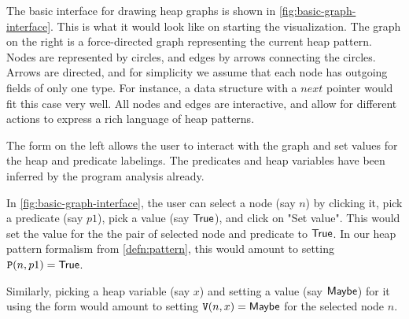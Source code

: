 The basic interface for drawing heap graphs is shown in \autoref{fig:basic-graph-interface}. This is what it would look like on starting the visualization. The graph on the right is a force-directed graph representing the current heap pattern. Nodes are represented by circles, and edges by arrows connecting the circles. Arrows are directed, and for simplicity we assume that each node has outgoing fields of only one type. For instance, a data structure with a $next$ pointer would fit this case very well. All nodes and edges are interactive, and allow for different actions to express a rich language of heap patterns.

The form on the left allows the user to interact with the graph and set values for the heap and predicate labelings. The predicates and heap variables have been inferred by the program analysis already.

\begin{ex}
\label{ex:basic-graph-interface}
In \autoref{fig:basic-graph-interface}, the user can select a node (say $n$) by clicking it, pick a predicate (say $p1$), pick a value (say $\mathsf{True}$), and click on "Set value". This would set the value for the the pair of selected node and predicate to $\mathsf{True}$. In our heap pattern formalism from \autoref{defn:pattern}, this would amount to setting $\mathtt{P}(n, p1) = \mathsf{True}$.

Similarly, picking a heap variable (say $x$) and setting a value (say $\mathsf{Maybe}$) for it using the form would amount to setting $\mathtt{V}(n,x) = \mathsf{Maybe}$ for the selected node $n$.
\end{ex}

